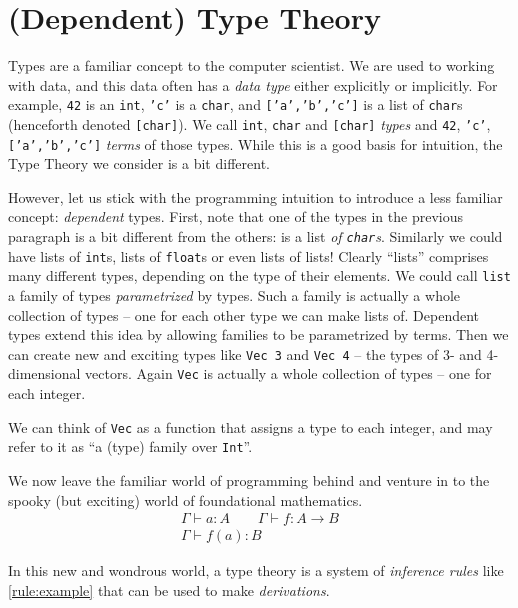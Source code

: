 \section{(Dependent) Type Theory}\label{sec/typetheory}
Types are a familiar concept to the computer scientist. We are used to working
with data, and this data often has a \emph{data type} either explicitly or
implicitly. For example, \texttt{42} is an \texttt{int}, \texttt{'c'} is a
\texttt{char}, and \texttt{['a','b','c']} is a list of \texttt{char}s (henceforth
denoted \texttt{[char]}). We call
\texttt{int}, \texttt{char} and \texttt{[char]} \emph{types} and
\texttt{42}, \texttt{'c'}, \texttt{['a','b','c']} \emph{terms} of those types.
While this is a good basis for intuition, the Type Theory we consider is a bit different.

However, let us stick with the programming intuition to introduce a less
familiar concept: \emph{dependent} types. First, note that one of the types in
the previous paragraph is a bit different from the others: \text{['a','b','c']} is a
list \emph{of \texttt{char}s}. Similarly we could have lists of \texttt{int}s,
lists of \texttt{float}s or even lists of lists! Clearly ``lists'' comprises
many different types, depending on the type of their elements. We could call
\texttt{list} a family of types \emph{parametrized} by types. Such a family is
actually a whole collection of types -- one for each other type we can make
lists of.
Dependent types extend this idea by allowing families to be parametrized by
terms. Then we can create new and exciting types like \texttt{Vec 3} and
\texttt{Vec 4} -- the types of 3- and 4-dimensional vectors. Again \texttt{Vec} is
actually a whole collection of types -- one for each integer.

We can think of \texttt{Vec} as a function that assigns a type to each integer,
and may refer to it as ``a (type) family over \texttt{Int}''.

We now leave the familiar world of programming behind and venture in to the spooky
(but exciting) world of foundational mathematics.
\begin{equation}
  \begin{array}{c}
    \Gamma \vdash a : A \qquad \Gamma \vdash f : A \rightarrow B\\
    \hline
    \Gamma \vdash f(a) : B
  \end{array}
  \label{rule:example}
\end{equation}

In this new and wondrous world, a type theory is a system of \emph{inference
  rules} like \ref{rule:example} that can be used to make \emph{derivations}.

